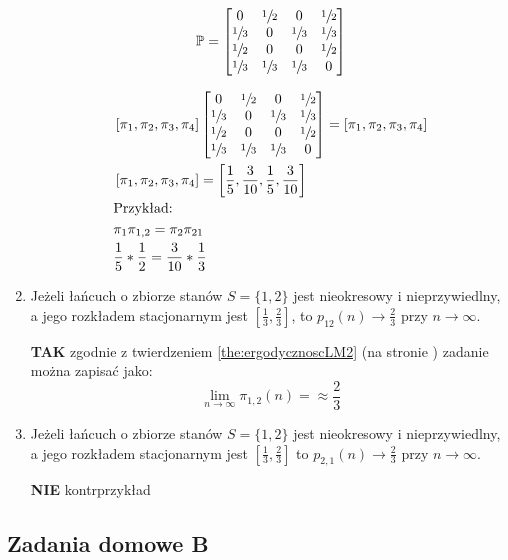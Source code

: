 \documentclass[a4paper,12pt]{article}
\theoremstyle{definition}%
\theoremstyle{definition}
\theoremstyle{problem}
\begin{document}
\begin{enumerate}[label=\alph*)]
\begin{multicols}{2}
$$\mathbb{P}=\begin{bmatrix}
0&\sfrac{1}{2}&0&\sfrac{1}{2}\\
\sfrac{1}{3}&0&\sfrac{1}{3}&\sfrac{1}{3}\\
\sfrac{1}{2}&0&0&\sfrac{1}{2}\\
\sfrac{1}{3}&\sfrac{1}{3}&\sfrac{1}{3}&0
\end{bmatrix}$$
\end{multicols}
\begin{align*}
&\left[\pi_1, \pi_2, \pi_3, \pi_4\right]\begin{bmatrix}
0&\sfrac{1}{2}&0&\sfrac{1}{2}\\
\sfrac{1}{3}&0&\sfrac{1}{3}&\sfrac{1}{3}\\
\sfrac{1}{2}&0&0&\sfrac{1}{2}\\
\sfrac{1}{3}&\sfrac{1}{3}&\sfrac{1}{3}&0
\end{bmatrix} = \left[\pi_1, \pi_2, \pi_3, \pi_4\right]\\
&\left[\pi_1, \pi_2, \pi_3, \pi_4\right] = \left[\frac{1}{5},\frac{3}{10},\frac{1}{5},\frac{3}{10}\right]\\
&\text{Przykład: }\\
&\pi _1\pi_{1,2}=\pi_2\pi_{21}\\
&\frac{1}{5}*\frac{1}{2}=\frac{3}{10}*\frac{1}{3}
\end{align*}


\item Jeżeli łańcuch o zbiorze stanów $S = \{1, 2\}$ jest nieokresowy i nieprzywiedlny, a jego rozkładem stacjonarnym jest $\left[\frac{1}{3}, \frac{2}{3}\right]$, to $p_{12}(n) \rightarrow \frac{2}{3}$ przy $n \rightarrow \infty$.

\textbf{TAK} zgodnie z twierdzeniem \ref{the:ergodycznoscLM2} (na stronie \pageref{the:ergodycznoscLM2}) zadanie można zapisać jako:
$$\lim _{n\rightarrow \infty} \pi _{1,2}(n)=\approx\frac{2}{3}$$

\item  Jeżeli łańcuch o zbiorze stanów $S = \{1,2\}$ jest nieokresowy i nieprzywiedlny, a jego rozkładem stacjonarnym jest $\left[ \frac{1}{3},\frac{2}{3}\right]$ to $p_{2,1}(n)\to\frac{2}{3}$ przy $n\to\infty$.

\textbf{NIE} kontrprzykład
\end{enumerate}

\subsection{Zadania domowe B}
\end{document}
